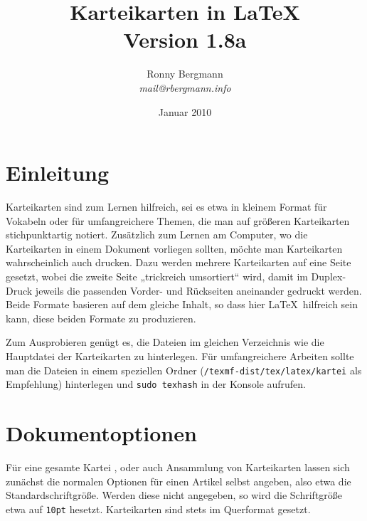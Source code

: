 \documentclass[a4paper,DIV=calc]{scrartcl}
\newcommand{\befehl}[1]{%
\marginpar{\textsf{#1}}%
}
\begin{document}
\title{Karteikarten in \LaTeX\\{\large Version 1.8a}}
\author{Ronny Bergmann\\\emph{mail@rbergmann.info}}
\date{Januar 2010}
\maketitle
\section{Einleitung}
Karteikarten sind zum Lernen hilfreich, sei es etwa in kleinem Format für Vokabeln oder für umfangreichere Themen, die man auf größeren Karteikarten stichpunktartig notiert. Zusätzlich zum Lernen am Computer, wo die Karteikarten in einem Dokument vorliegen sollten, möchte man Karteikarten wahrscheinlich auch drucken. Dazu werden mehrere Karteikarten auf eine Seite gesetzt, wobei die zweite Seite „trickreich umsortiert“ wird, damit im Duplex-Druck jeweils die passenden Vorder- und Rückseiten aneinander gedruckt werden. Beide Formate basieren auf dem gleiche Inhalt, so dass hier \LaTeX\ hilfreich sein kann, diese beiden Formate zu produzieren.

Zum Ausprobieren genügt es, die Dateien im gleichen Verzeichnis wie die Hauptdatei der Karteikarten zu hinterlegen. Für umfangreichere Arbeiten sollte man die Dateien in einem speziellen Ordner (\lstinline!/texmf-dist/tex/latex/kartei! als Empfehlung) hinterlegen und \lstinline!sudo texhash! in der Konsole aufrufen.

\section{Dokumentoptionen}
Für eine gesamte Kartei \befehl{\textbackslash document-\\class\{kartei\}}, oder auch Ansammlung von Karteikarten lassen sich zunächst die normalen Optionen für einen Artikel selbst angeben, also etwa die Standardschriftgröße. Werden diese nicht angegeben, so wird die Schriftgröße etwa auf \lstinline!10pt! hesetzt. Karteikarten sind stets im Querformat gesetzt.
\end{document}
